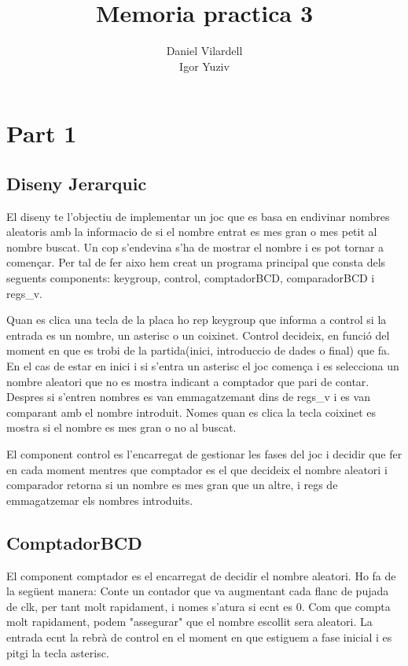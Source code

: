 \documentclass[12pt, a4papre]{article}
\author{Daniel Vilardell\\
	   Igor Yuziv}
\title{Memoria practica 3}
\date{}
\begin{document}
	\maketitle
	\tableofcontents

	
	\newpage
	\section{Part 1}
	\subsection{Diseny Jerarquic}
	El diseny te l'objectiu de implementar un joc que es basa en endivinar nombres aleatoris amb la informacio de si el nombre entrat es mes gran o mes petit al nombre buscat. Un cop s'endevina s'ha de mostrar el nombre i es pot tornar a començar. Per tal de fer aixo hem creat un programa principal que consta dels seguents components: keygroup, control, comptadorBCD, comparadorBCD i regs\_v. 
	
	Quan es clica una tecla de la placa ho rep keygroup que informa a control si la entrada es un nombre, un asterisc o un coixinet. Control decideix, en funció del moment en que es trobi de la partida(inici, introduccio de dades o final) que fa. En el cas de estar en inici i si s'entra un asterisc el joc comença i es selecciona un nombre aleatori que no es mostra indicant a comptador que pari de contar. Despres si s'entren nombres es van emmagatzemant dins de regs\_v i es van comparant amb el nombre introduit. Nomes quan es clica la tecla coixinet es mostra si el nombre es mes gran o no al buscat.
	
	El component control es l'encarregat de gestionar les fases del joc i decidir que fer en cada moment mentres que comptador es el que decideix el nombre aleatori i comparador retorna si un nombre es mes gran que un altre, i regs de emmagatzemar els nombres introduits.
	
	\newpage
	
	\subsection{ComptadorBCD}
	
	El component comptador es el encarregat de decidir el nombre aleatori. Ho fa de la següent manera: Conte un contador que va augmentant cada flanc de pujada de clk, per tant molt rapidament, i nomes s'atura si ecnt es 0. Com que compta molt rapidament, podem "assegurar" que el nombre escollit sera aleatori. La entrada ecnt la rebrà de control en el moment en que estiguem a fase inicial i es pitgi la tecla asterisc.
	
\end{document}
